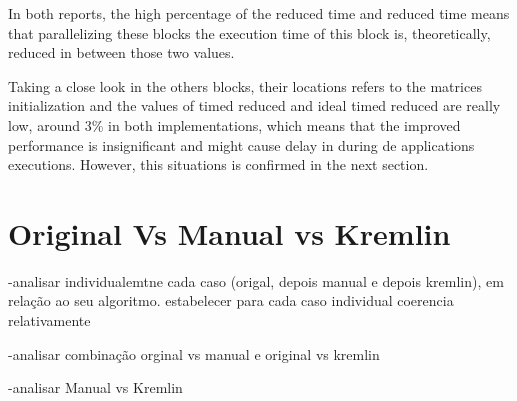 In both reports, the high percentage of the reduced time and reduced time means that parallelizing these blocks the execution time of this block is, theoretically, reduced in between those two values. 

Taking a close look in the others blocks, their locations refers to the matrices initialization and the values of timed reduced and ideal timed reduced are really low, around 3\% in both implementations, which means that the improved performance is insignificant and might cause delay in during de applications executions. However, this situations is confirmed in the next section. 


\section{Original Vs Manual vs Kremlin}

-analisar individualemtne cada caso (origal, depois manual e depois kremlin), em relação ao seu algoritmo. estabelecer para cada caso individual coerencia relativamente 

-analisar combinação orginal vs manual e original vs kremlin

-analisar Manual vs Kremlin


